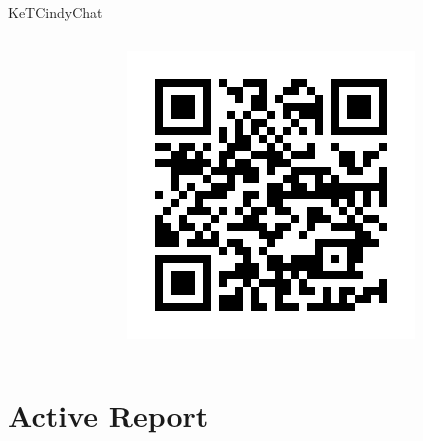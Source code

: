 \documentclass[dvipdfmx, unicode]{beamer}
\begin{document}
\begin{frame}{KeTCindyChat}
  \begin{columns}[T]
    \begin{column}{0.5\linewidth}
    \end{column}
    \begin{column}{0.5\linewidth}
      \includegraphics[width=\linewidth]{img/KeTCindyChat/KeTCindyChatGPT.png}
    \end{column}
  \end{columns}
\end{frame}

\section{Active Report}
\end{document}
